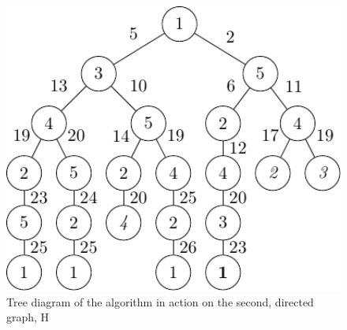 \begin{figure}
\centering
\includegraphics[keepaspectratio,width=1.0\textwidth,height=0.35\textheight]{chapters/tsp/figs/ugraph-figure3}
\caption[Tree diagram of the algorithm's operation on a directed graph]{\label{fig:tsp:dtree}Tree diagram of the algorithm in action on the second, directed graph, H}
\end{figure}

\begin{cpobjectsfloat}
\begin{cpobjects}
\end{cpobjects}
    \caption[Set of subcells from H in the skin membrane at the initial state]{\label{objs:tsp:obj1d}Set of subcells from H in the skin membrane at the initial state (those different from G are in bold)}
\end{cpobjectsfloat}

